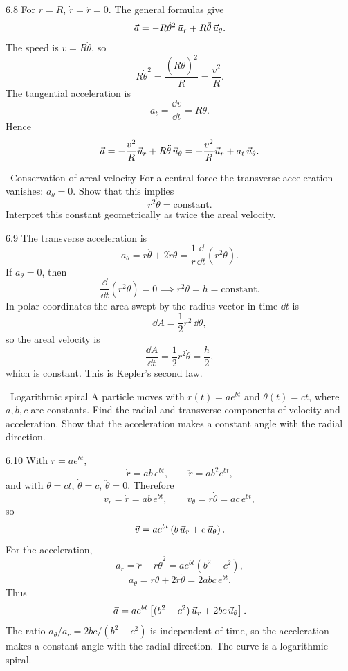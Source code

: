 \begin{solution}{6.8}
For $r=R$, $\dot r=\ddot r=0$. The general formulas give
\[
\vec a=-R\dot\theta^2\,\vec{u}_r+R\ddot\theta\,\vec{u}_\theta.
\]
The speed is $v=R\dot\theta$, so
\[
R\dot\theta^2=\frac{(R\dot\theta)^2}{R}=\frac{v^2}{R}.
\]
The tangential acceleration is
\[
a_t=\frac{\dd v}{\dd t}=R\ddot\theta.
\]
Hence
\[
\vec a=-\frac{v^2}{R}\vec{u}_r+R\ddot\theta\,\vec{u}_\theta
=-\frac{v^2}{R}\vec{u}_r+a_t\,\vec{u}_\theta.
\]
\end{solution}

\begin{exercise}{\mastery\ Conservation of areal velocity}
For a central force the transverse acceleration vanishes: $a_\theta=0$. Show
that this implies
\[
r^2\dot\theta=\text{constant}.
\]
Interpret this constant geometrically as twice the areal velocity.
\end{exercise}

\begin{tabletworkspace}[6.5cm]
\end{tabletworkspace}

\begin{solution}{6.9}
The transverse acceleration is
\[
a_\theta=r\ddot\theta+2\dot r\dot\theta
=\frac1r\frac{\dd}{\dd t}\left(r^2\dot\theta\right).
\]
If $a_\theta=0$, then
\[
\frac{\dd}{\dd t}\left(r^2\dot\theta\right)=0
\implies
r^2\dot\theta=h=\text{constant}.
\]
In polar coordinates the area swept by the radius vector in time $\dd t$ is
\[
\dd A=\frac12r^2\,\dd\theta,
\]
so the areal velocity is
\[
\frac{\dd A}{\dd t}=\frac12r^2\dot\theta=\frac h2,
\]
which is constant. This is Kepler's second law.
\end{solution}

\begin{exercise}{\mastery\ Logarithmic spiral}
A particle moves with $r(t)=ae^{bt}$ and $\theta(t)=ct$, where $a,b,c$ are
constants. Find the radial and transverse components of velocity and
acceleration. Show that the acceleration makes a constant angle with the radial
direction.
\end{exercise}

\begin{tabletworkspace}[6.5cm]
\end{tabletworkspace}

\begin{solution}{6.10}
With $r=ae^{bt}$,
\[
\dot r=ab\,e^{bt},\qquad \ddot r=ab^2e^{bt},
\]
and with $\theta=ct$, $\dot\theta=c$, $\ddot\theta=0$. Therefore
\[
v_r=\dot r=ab\,e^{bt},\qquad
v_\theta=r\dot\theta=ac\,e^{bt},
\]
so
\[
\vec v=ae^{bt}\left(b\,\vec{u}_r+c\,\vec{u}_\theta\right).
\]
For the acceleration,
\[
a_r=\ddot r-r\dot\theta^2
=ae^{bt}\left(b^2-c^2\right),
\]
\[
a_\theta=r\ddot\theta+2\dot r\dot\theta
=2abc\,e^{bt}.
\]
Thus
\[
\vec a=ae^{bt}\left[(b^2-c^2)\,\vec{u}_r+2bc\,\vec{u}_\theta\right].
\]
The ratio $a_\theta/a_r=2bc/(b^2-c^2)$ is independent of time, so the acceleration
makes a constant angle with the radial direction. The curve is a logarithmic
spiral.
\end{solution}

